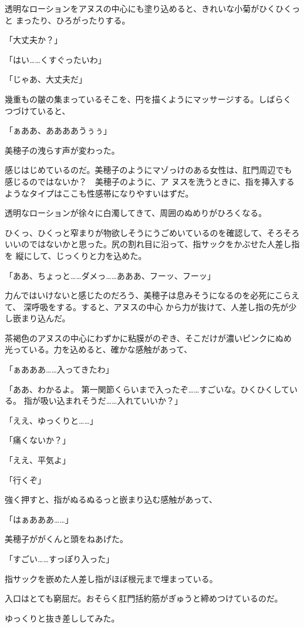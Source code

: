 ﻿\documentclass[
    book,tate,
    line_length=30zw,
    jafontsize=12pt,
    paper=b5j,
    landscape,
    ]{jlreq}
\begin{document}
透明なローションをアヌスの中心にも塗り込めると、きれいな小菊がひくひくっと
まったり、ひろがったりする。

「大丈夫か？」

「はい……くすぐったいわ」

「じゃあ、大丈夫だ」

幾重もの皺の集まっているそこを、円を描くようにマッサージする。しばらく
つづけていると、

「ぁああ、ああああうぅぅ」

美穂子の洩らす声が変わった。

感じはじめているのだ。美穂子のようにマゾっけのある女性は、肛門周辺でも
感じるのではないか？　美穂子のように、ア ヌスを洗うときに、指を挿入する
ようなタイプはここも性感帯になりやすいはずだ。

透明なローションが徐々に白濁してきて、周囲のぬめりがひろくなる。

ひくっ、ひくっと窄まりが物欲しそうにうごめいているのを確認して、そろそろ
いいのではないかと思った。尻の割れ目に沿って、指サックをかぶせた人差し指を
縦にして、じっくりと力を込めた。

「ああ、ちょっと……ダメっ……あああ、フーッ、フーッ」

力んではいけないと感じたのだろう、美穂子は息みそうになるのを必死にこらえて、
深呼吸をする。すると、アヌスの中心 から力が抜けて、人差し指の先が少し嵌まり込んだ。

茶褐色のアヌスの中心にわずかに粘膜がのぞき、そこだけが濃いピンクにぬめ
光っている。力を込めると、確かな感触があって、

「ぁあああ……入ってきたわ」

「ああ、わかるよ。 第一関節くらいまで入ったぞ……すごいな。ひくひくしている。
指が吸い込まれそうだ……入れていいか？」

「ええ、ゆっくりと……」

「痛くないか？」

「ええ、平気よ」

「行くぞ」

強く押すと、指がぬるぬるっと嵌まり込む感触があって、

「はぁあああ……」

美穂子ががくんと頭をねあげた。

「すごい……すっぽり入った」

指サックを嵌めた人差し指がほぼ根元まで埋まっている。

入口はとても窮屈だ。おそらく肛門括約筋がぎゅうと締めつけているのだ。

ゆっくりと抜き差ししてみた。
\end{document}

